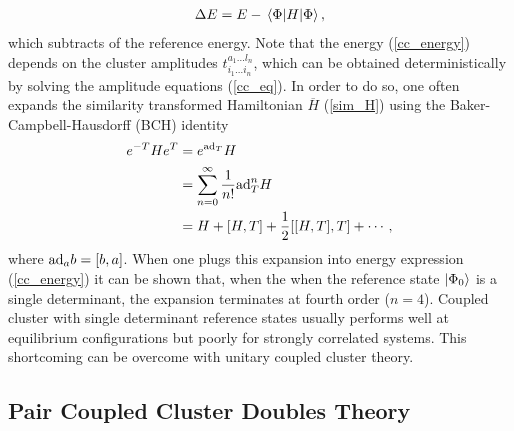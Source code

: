 \documentclass[10pt]{article}
\begin{document}
\begin{align}
\label{cc_e_corr}
\Delta E = E-\mel{\Phi}{H}{\Phi},
\end{align}
which subtracts of the reference energy. Note that the energy (\ref{cc_energy}) depends on the cluster amplitudes $t_{i_1\ldots i_n}^{a_1\ldots l_n}$, which can be obtained deterministically by solving the amplitude equations (\ref{cc_eq}). In order to do so, one often expands the similarity transformed Hamiltonian $\overline{H}$ (\ref{sim_H}) using the Baker-Campbell-Hausdorff (BCH) identity
\begin{align}
e^{-T}He^T
&=
e^{\text{ad}_T}H
\nonumber
\\
&=
\sum_{n=0}^\infty\frac{1}{n!}\text{ad}^n_TH
\nonumber
\\
&=
\label{cc_bch_expansion}
H+\comm{H}{T}+\frac{1}{2}\comm{\comm{H}{T}}{T}+\cdots,
\end{align}
where $\text{ad}_ab=\comm{b}{a}$. When one plugs this expansion into energy expression (\ref{cc_energy}) it can be shown that, when the when the reference state $\ket{\Phi_0}$ is a single determinant, the expansion terminates at fourth order ($n=4$). Coupled cluster with single determinant reference states usually performs well at equilibrium configurations but poorly for strongly correlated systems. This shortcoming can be overcome with unitary coupled cluster theory.

\subsection{Pair Coupled Cluster Doubles Theory}
\end{document}
